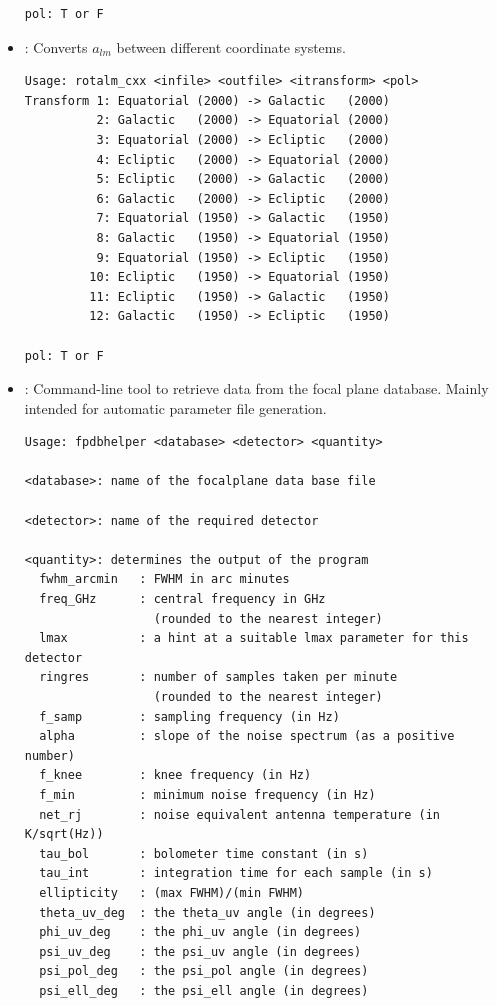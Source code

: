 \begin{itemize}
\begin{verbatim}
pol: T or F
\end{verbatim}

\item {}: Converts $a_{lm}$ between different
coordinate systems.

\begin{verbatim}
Usage: rotalm_cxx <infile> <outfile> <itransform> <pol>
Transform 1: Equatorial (2000) -> Galactic   (2000)
          2: Galactic   (2000) -> Equatorial (2000)
          3: Equatorial (2000) -> Ecliptic   (2000)
          4: Ecliptic   (2000) -> Equatorial (2000)
          5: Ecliptic   (2000) -> Galactic   (2000)
          6: Galactic   (2000) -> Ecliptic   (2000)
          7: Equatorial (1950) -> Galactic   (1950)
          8: Galactic   (1950) -> Equatorial (1950)
          9: Equatorial (1950) -> Ecliptic   (1950)
         10: Ecliptic   (1950) -> Equatorial (1950)
         11: Ecliptic   (1950) -> Galactic   (1950)
         12: Galactic   (1950) -> Ecliptic   (1950)

pol: T or F
\end{verbatim}

\item {}: Command-line tool to retrieve data from the focal plane
database. Mainly intended for automatic parameter file generation.

\begin{verbatim}
Usage: fpdbhelper <database> <detector> <quantity>

<database>: name of the focalplane data base file

<detector>: name of the required detector

<quantity>: determines the output of the program
  fwhm_arcmin   : FWHM in arc minutes
  freq_GHz      : central frequency in GHz
                  (rounded to the nearest integer)
  lmax          : a hint at a suitable lmax parameter for this detector
  ringres       : number of samples taken per minute
                  (rounded to the nearest integer)
  f_samp        : sampling frequency (in Hz)
  alpha         : slope of the noise spectrum (as a positive number)
  f_knee        : knee frequency (in Hz)
  f_min         : minimum noise frequency (in Hz)
  net_rj        : noise equivalent antenna temperature (in K/sqrt(Hz))
  tau_bol       : bolometer time constant (in s)
  tau_int       : integration time for each sample (in s)
  ellipticity   : (max FWHM)/(min FWHM)
  theta_uv_deg  : the theta_uv angle (in degrees)
  phi_uv_deg    : the phi_uv angle (in degrees)
  psi_uv_deg    : the psi_uv angle (in degrees)
  psi_pol_deg   : the psi_pol angle (in degrees)
  psi_ell_deg   : the psi_ell angle (in degrees)
\end{verbatim}


\end{itemize}
